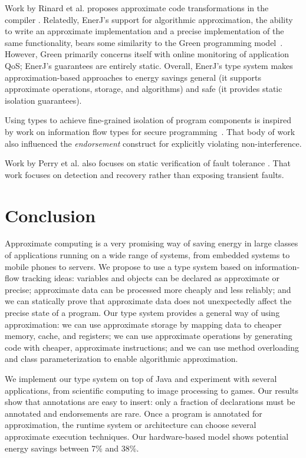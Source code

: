 Work by Rinard et al.
proposes approximate code transformations in the compiler
\cite{perforationtr, qosprof, rinard-onward}.
Relatedly,
EnerJ's support for algorithmic approximation, the ability to write an
approximate implementation and a precise implementation of the same
functionality, bears some similarity to the Green programming
model~\cite{green}. However, Green primarily concerns itself with
online monitoring of application QoS; EnerJ's guarantees are entirely
static. Overall, EnerJ's type system makes approximation-based
approaches to energy savings general (it supports approximate
operations, storage, and algorithms) and safe (it provides static
isolation guarantees).

Using types to achieve fine-grained isolation of program
components is inspired by work on information flow types for secure
programming~\cite{infflow-survey,jif}. That body of work also influenced
the \emph{endorsement} construct for explicitly violating
non-interference.

Work by Perry et al. also focuses on static verification of fault tolerance
\cite{perry-pldi,perry-sas}. That work focuses on detection and
recovery rather than exposing transient faults.



\section{Conclusion}
\label{enerj:sec:conc}

Approximate computing is a very promising way of saving energy in
large classes of applications running on a wide range of systems, from
embedded systems to mobile phones to servers. We propose to use
a type system based on information-flow tracking ideas: variables and
objects can be declared as approximate or precise; approximate data can
be processed more cheaply and less reliably; and we can statically
prove that approximate data does not unexpectedly affect the precise
state of a program.
Our type system provides a general way of using approximation:
we can use approximate storage by mapping data to cheaper memory,
cache, and registers; we can use approximate operations by generating
code with cheaper, approximate instructions; and we can use method
overloading and class parameterization to enable algorithmic
approximation.

We implement our type system on top of Java and experiment with
several applications, from scientific computing to image processing to
games. Our results show that annotations are easy to insert:
only a fraction of declarations must be annotated and endorsements are
rare. Once a program is annotated for approximation, the runtime
system or architecture can choose several approximate execution
techniques. Our hardware-based model shows potential energy savings
between 7\% and 38\%.
